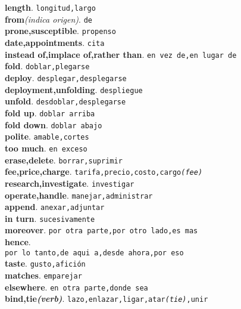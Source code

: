 \documentclass[twocolumn]{article}
\begin{document}
	\textsf{\textbf{length}}. \texttt{longitud,largo}\\
	\textsf{\textbf{from}}{\scriptsize \textsl{(indica origen)}}. \texttt{de}\\
	\textsf{\textbf{prone,susceptible}}. \texttt{propenso}\\
	\textsf{\textbf{date,appointments}}. \texttt{cita}\\
	\textsf{\textbf{instead of,implace of,rather than}}. \texttt{en vez de,en lugar de}\\
	\textsf{\textbf{fold}}. \texttt{doblar,plegarse}\\
	\textsf{\textbf{deploy}}. \texttt{desplegar,desplegarse}\\
	\textsf{\textbf{deployment,unfolding}}. \texttt{despliegue}\\
	\textsf{\textbf{unfold}}. \texttt{desdoblar,desplegarse}\\
	\textsf{\textbf{fold up}}. \texttt{doblar arriba}\\
	\textsf{\textbf{fold down}}. \texttt{doblar abajo}\\
	\textsf{\textbf{polite}}. \texttt{amable,cortes}\\
	\textsf{\textbf{too much}}. \texttt{en exceso}\\
	\textsf{\textbf{erase,delete}}. \texttt{borrar,suprimir}\\
	\textsf{\textbf{fee,price,charge}}. \texttt{tarifa,precio,costo,cargo{\scriptsize \textsl{(fee)}}}\\
	\textsf{\textbf{research,investigate}}. \texttt{investigar}\\
	\textsf{\textbf{operate,handle}}. \texttt{manejar,administrar}\\
	\textsf{\textbf{append}}. \texttt{anexar,adjuntar}\\
	\textsf{\textbf{in turn}}. \texttt{sucesivamente}\\
	\textsf{\textbf{moreover}}. \texttt{por otra parte,por otro lado,es mas}\\
	\textsf{\textbf{hence}}.\\\texttt{por lo tanto,de aqui a,desde ahora,por eso}\\
	\textsf{\textbf{taste}}. \texttt{gusto,afici\'on}\\
	\textsf{\textbf{matches}}. \texttt{emparejar}\\
	\textsf{\textbf{elsewhere}}. \texttt{en otra parte,donde sea}\\
	\textsf{\textbf{bind,tie{\scriptsize \textsl{(verb)}}}}. \texttt{lazo,enlazar,ligar,atar{\scriptsize \textsl{(tie)}},unir}\\
\end{document}
